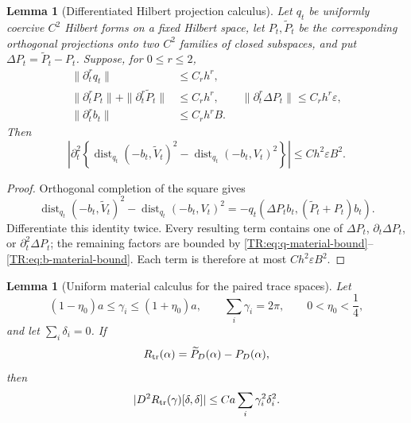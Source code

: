 \documentclass[11pt]{amsart}
\numberwithin{equation}{section}
\newtheorem{lemma}[theorem]{Lemma}
\theoremstyle{definition}
\theoremstyle{remark}
\begin{document}
\begin{lemma}[Differentiated Hilbert projection calculus]
\label{TR:lem:projection-calculus}
Let $q_t$ be uniformly coercive $C^2$ Hilbert forms on a fixed Hilbert
space, let $P_t,\widetilde P_t$ be the corresponding orthogonal
projections onto two $C^2$ families of closed subspaces, and put
$\Delta P_t=\widetilde P_t-P_t$.  Suppose, for $0\le r\le2$,
\begin{align}
 \|\partial_t^rq_t\|&\le C_rh^r,
 \label{TR:eq:q-material-bound}\\
 \|\partial_t^rP_t\|+\|\partial_t^r\widetilde P_t\|
 &\le C_rh^r,
 \qquad
 \|\partial_t^r\Delta P_t\|\le C_rh^r\varepsilon,
 \label{TR:eq:P-material-bound}\\
 \|\partial_t^rb_t\|&\le C_rh^rB.
 \label{TR:eq:b-material-bound}
\end{align}
Then
\begin{equation}\label{TR:eq:projection-calculus-output}
 \left|\partial_t^2\left\{
 \operatorname {dist}_{q_t}(-b_t,\widetilde V_t)^2-
 \operatorname {dist}_{q_t}(-b_t,V_t)^2\right\}\right|
 \le Ch^2\varepsilon B^2.
\end{equation}
\end{lemma}

\begin{proof}
Orthogonal completion of the square gives
\begin{equation}\label{TR:eq:projection-difference-identity}
 \operatorname {dist}_{q_t}(-b_t,\widetilde V_t)^2-
 \operatorname {dist}_{q_t}(-b_t,V_t)^2
 =-q_t(\Delta P_tb_t,(\widetilde P_t+P_t)b_t).
\end{equation}
Differentiate this identity twice.  Every resulting term contains one of
$\Delta P_t$, $\partial_t\Delta P_t$, or
$\partial_t^2\Delta P_t$; the remaining factors are bounded by
\eqref{TR:eq:q-material-bound}--\eqref{TR:eq:b-material-bound}.  Each term is
therefore at most $Ch^2\varepsilon B^2$.
\end{proof}

\begin{lemma}[Uniform material calculus for the paired trace spaces]
\label{TR:lem:material-calculus}
Let
\begin{equation}\label{TR:eq:quasiuniform-band}
 (1-\eta_0)a\le\gamma_i\le(1+\eta_0)a,\qquad
 \sum_i\gamma_i=2\pi,\qquad 0<\eta_0<\frac14,
\end{equation}
and let $\sum_i\delta_i=0$.  If
\begin{equation}\label{TR:eq:Rtr}
 R_{\rm tr}(\alpha)=\widetilde P_D(\alpha)-P_D(\alpha),
\end{equation}
then
\begin{equation}\label{TR:eq:transfer-hessian}
 |D^2R_{\rm tr}(\gamma)[\delta,\delta]|
 \le Ca\sum_i\gamma_i^2\delta_i^2.
\end{equation}
\end{lemma}
\end{document}
